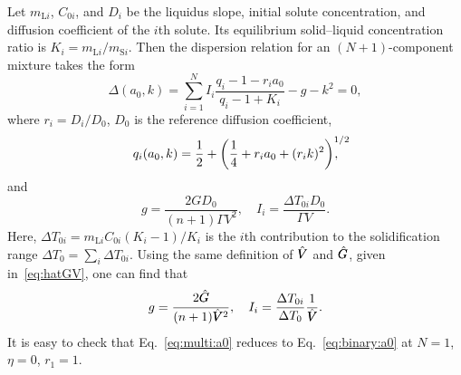\documentclass{article}
\newcommand{\liq}{\text{L}}
\newcommand{\sol}{\text{S}}
\newcommand{\hV}[1][\qty(\bar{V})]{\vphantom{#1}\mathrlap{\smash{\hat{V}}}V}
\newcommand{\hG}[1][\qty(\bar{G})]{\vphantom{#1}\mathrlap{\smash{\hat{G}}}G}
\begin{document}
Let $m_{\liq i}$, $C_{0i}$, and $D_i$ be the liquidus slope, initial solute concentration,
and diffusion coefficient of the $i$th solute.
Its equilibrium solid--liquid concentration ratio is $K_i = m_{\liq i}/m_{\sol i}$.
Then the dispersion relation for an $(N+1)$-component mixture takes the form
\begin{equation}\label{eq:multi:a0}
    \Delta(a_0,k) = \sum_{i=1}^{N}I_i\frac{q_i - 1 - r_ia_0}{q_i - 1 + K_i} - g - k^2 = 0,
\end{equation}
where $r_i = D_i/D_0$, $D_0$ is the reference diffusion coefficient,
\begin{equation}\label{eq:multi:q}
    q_i(a_0,k) = \frac12 + \qty(\frac14 + r_ia_0 + (r_ik)^2)^{\mathrlap{1/2}},
\end{equation}
and
\begin{equation}\label{eq:multi:gI}
    g = \frac{2GD_0}{(n+1)\Gamma V^2}, \quad I_i = \frac{\Delta{T}_{0i}D_0}{\Gamma V}.
\end{equation}
Here, $\Delta{T}_{0i} = m_{\liq i}C_{0i}(K_i-1)/K_i$ is the $i$th contribution to the solidification range
$\Delta{T}_0 = \sum_i \Delta{T}_{0i}$.
Using the same definition of $\hV$ and $\hG$, given in~\eqref{eq:hatGV}, one can find that
\begin{equation}\label{eq:multi:gI2}
    g = \frac{2\hG}{(n+1)\hV^2}, \quad I_i = \frac{\Delta{T}_{0i}}{\Delta{T}_0}\frac1{\hV}.
\end{equation}
It is easy to check that Eq.~\eqref{eq:multi:a0} reduces to Eq.~\eqref{eq:binary:a0} at $N=1$, $\eta=0$, $r_1=1$.

\printbibliography
\end{document}
